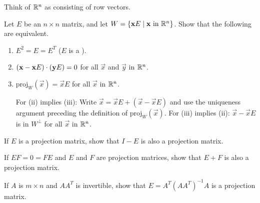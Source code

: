 \documentclass{ximera}
\begin{document}
\begin{problem}
Think of $\mathbb{R}^n$ as consisting of row vectors.

\begin{problem}\label{prob:8_1_17.1}
\item Let $E$ be an $n \times n$ matrix, and let $W = \{\mathbf{x} E \mid \mathbf{x} \mbox{ in } \mathbb{R}^n\}$. Show that the following are equivalent.


\begin{enumerate}
\item $E^{2} = E = E^{T}$ ($E$ is a ).

\item $(\mathbf{x} - \mathbf{x}E) \cdot (\mathbf{y}E) = 0$ for all $\vec{x}$ and $\vec{y}$ in $\mathbb{R}^n$.

\item $\mbox{proj}_W(\vec{x}) = \vec{x}E$ for all $\vec{x}$ in $\mathbb{R}^n$.
\begin{hint}
For (ii) implies (iii): Write $\vec{x} = \vec{x}E + (\vec{x} - \vec{x}E)$ and use the uniqueness argument preceding the definition of $\mbox{proj}_W(\vec{x})$. For (iii) implies (ii): $\vec{x} - \vec{x}E$ is in $W^\perp$ for all $\vec{x}$ in $\mathbb{R}^n$.
\end{hint}
\end{enumerate}
\end{problem}

\begin{problem}\label{prob:8_1_17.2}
If $E$ is a projection matrix, show that $I - E$ is also a projection matrix.
\end{problem}

\begin{problem}\label{prob:8_1_17.3}
If $EF = 0 = FE$ and $E$ and $F$ are projection matrices, show that $E + F$ is also a projection matrix.

\end{problem}

\begin{problem}\label{prob:8_1_17.4}
If $A$ is $m \times n$ and $AA^{T}$ is invertible, show that $E = A^{T}(AA^{T})^{-1}A$ is a projection matrix.
\end{problem}

\end{problem}
\end{document}
